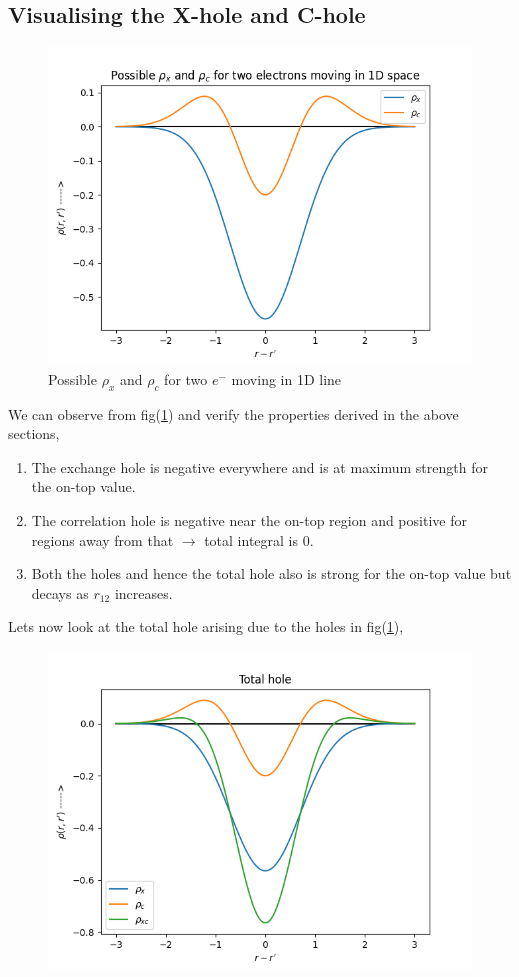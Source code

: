 \documentclass{article}
\begin{document}
\begin{Large}
\begin{flushleft}
  \subsection*{\Large{Visualising the X-hole and C-hole}}
  \begin{figure}[h]
  \centering
  \includegraphics[scale=0.88]{nx_nc.png}
  \caption{Possible $\rho_x$ and $\rho_c$ for two $e^-$ moving in 1D line}
  \label{fig:XC-hole}
  \end{figure}
  We can observe from fig(\ref{fig:XC-hole}) and verify the properties derived in the above sections,
  \begin{enumerate}
  \item{The exchange hole is negative everywhere and is at maximum strength for the on-top value.}
  \item{The correlation hole is negative near the on-top region and positive for regions away from that $\rightarrow$ total integral is 0.}
  \item{Both the holes and hence the total hole also is strong for the on-top value but decays as $r_{12}$ increases.}
  \end{enumerate}
  Lets now look at the total hole arising due to the holes in fig(\ref{fig:XC-hole}),\\
  \begin{figure}[h]
  \centering
  \includegraphics[scale=0.88]{nx_nc_ntotal.png}

\end{figure}
\end{flushleft}
\end{Large}
\end{document}

